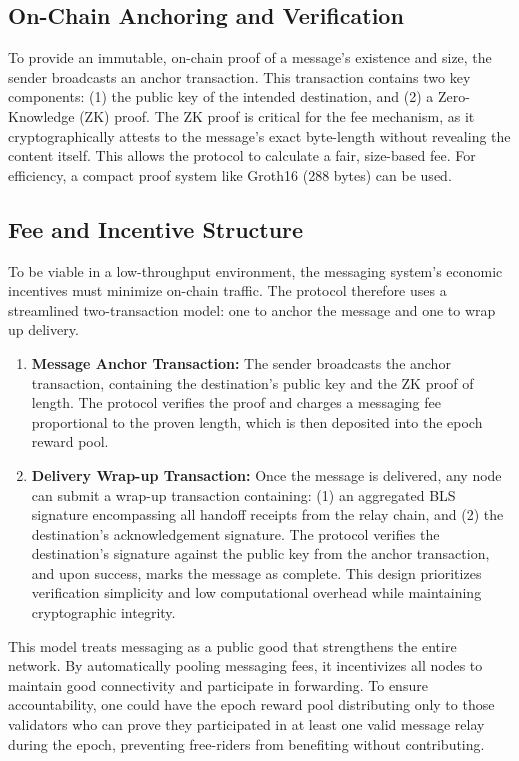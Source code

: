 \documentclass{article}
\begin{document}
\subsection{On-Chain Anchoring and Verification}

To provide an immutable, on-chain proof of a message's existence and size, the sender broadcasts an anchor transaction. This transaction contains two key components: (1) the public key of the intended destination, and (2) a Zero-Knowledge (ZK) proof. The ZK proof is critical for the fee mechanism, as it cryptographically attests to the message's exact byte-length without revealing the content itself. This allows the protocol to calculate a fair, size-based fee. For efficiency, a compact proof system like Groth16 (288 bytes) can be used.

\subsection{Fee and Incentive Structure}

To be viable in a low-throughput environment, the messaging system's economic incentives must minimize on-chain traffic. The protocol therefore uses a streamlined two-transaction model: one to anchor the message and one to wrap up delivery.

\begin{enumerate}
    \item \textbf{Message Anchor Transaction:} The sender broadcasts the anchor transaction, containing the destination's public key and the ZK proof of length. The protocol verifies the proof and charges a messaging fee proportional to the proven length, which is then deposited into the epoch reward pool.
    \item \textbf{Delivery Wrap-up Transaction:} Once the message is delivered, any node can submit a wrap-up transaction containing: (1) an aggregated BLS signature encompassing all handoff receipts from the relay chain, and (2) the destination's acknowledgement signature. The protocol verifies the destination's signature against the public key from the anchor transaction, and upon success, marks the message as complete. This design prioritizes verification simplicity and low computational overhead while maintaining cryptographic integrity.
\end{enumerate}

This model treats messaging as a public good that strengthens the entire network. By automatically pooling messaging fees, it incentivizes all nodes to maintain good connectivity and participate in forwarding. To ensure accountability, one could have the epoch reward pool distributing only to those validators who can prove they participated in at least one valid message relay during the epoch, 
preventing free-riders from benefiting without contributing.
\end{document}
